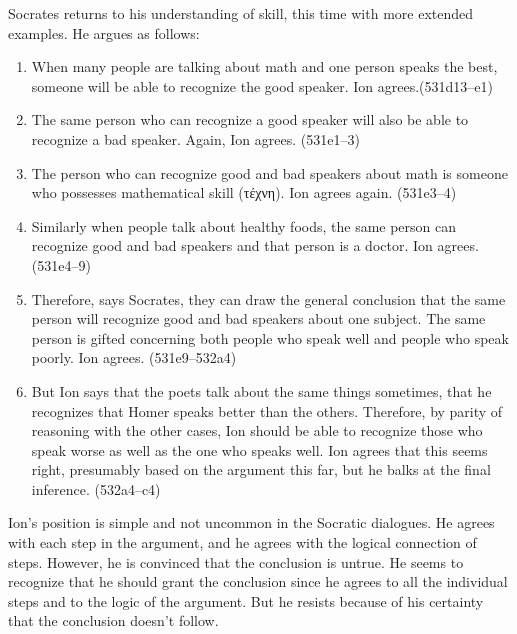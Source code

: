 \documentclass[11pt,letterpaper]{article}
\begin{document}
Socrates returns to his understanding of skill, this time with more extended examples. He argues as follows:

\begin{enumerate}

    \item When many people are talking about math and one person speaks the best, someone will be able to recognize the good speaker. Ion agrees.(531d13--e1)

    \item The same person who can recognize a good speaker will also be able to recognize a bad speaker. Again, Ion agrees. (531e1--3)

    \item The person who can recognize good and bad speakers about math is someone who possesses mathematical skill (\textgreek{τέχνη}). Ion agrees again. (531e3--4)

    \item Similarly when people talk about healthy foods, the same person can recognize good and bad speakers and that person is a doctor. Ion agrees. (531e4--9)

    \item Therefore, says Socrates, they can draw the general conclusion that the same person will recognize good and bad speakers about one subject. The same person is gifted concerning both people who speak well and people who speak poorly. Ion agrees. (531e9--532a4)

    \item But Ion says that the poets talk about the same things sometimes, that he recognizes that Homer speaks better than the others. Therefore, by parity of reasoning with the other cases, Ion should be able to recognize those who speak worse as well as the one who speaks well. Ion agrees that this seems right, presumably based on the argument this far, but he balks at the final inference. (532a4--c4)

\end{enumerate}

Ion's position is simple and not uncommon in the Socratic dialogues. He agrees with each step in the argument, and he agrees with the logical connection of steps. However, he is convinced that the conclusion is untrue. He seems to recognize that he should grant the conclusion since he agrees to all the individual steps and to the logic of the argument. But he resists because of his certainty that the conclusion doesn't follow.
\end{document}
